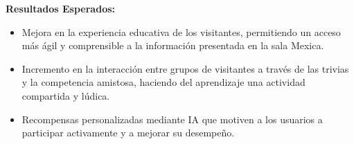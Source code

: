 \documentclass{report}
\begin{document}
    \textbf{Resultados Esperados:}
    \begin{itemize}
        \item Mejora en la experiencia educativa de los visitantes, permitiendo un acceso más ágil y comprensible a la información presentada en la sala Mexica.
        \item Incremento en la interacción entre grupos de visitantes a través de las trivias y la competencia amistosa, haciendo del aprendizaje una actividad compartida y lúdica.
        \item Recompensas personalizadas mediante IA que motiven a los usuarios a participar activamente y a mejorar su desempeño.
    \end{itemize}
\end{document}
